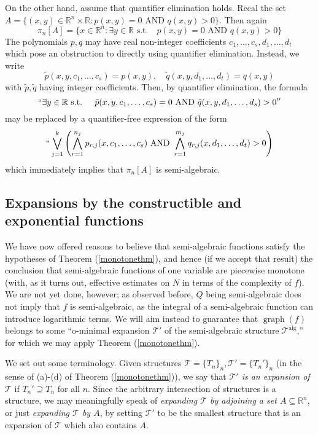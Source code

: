 \documentclass[12pt]{article}
\let\oldref\ref
\renewcommand{\ref}[1]{(\oldref{#1})}
\newcommand{\R}{\mathbb{R}}
\theoremstyle{definition}
\theoremstyle{remark}
\numberwithin{equation}{section}
\begin{document}
On the other hand, assume that quantifier elimination holds. Recal the set $A=\{(x,y)\in\R^n\times\R:p(x,y)=0\text{ AND }q(x,y)>0\}$. Then again
\begin{equation*}
    \pi_n[A]=\{x\in\R^n:\exists y\in\R\text{ s.t.}\quad p(x,y)=0\text{ AND }q(x,y)>0\}
\end{equation*}
The polynomials $p,q$ may have real non-integer coefficients $c_1,\ldots,c_s,d_1,\ldots,d_t$ which pose an obstruction to directly using quantifier elimination. Instead, we write
\begin{equation}
    \tilde{p}(x,y,c_1,\ldots,c_s)=p(x,y),\quad \tilde{q}(x,y,d_1,\ldots,d_t)=q(x,y)
\end{equation}
with $\tilde{p},\tilde{q}$ having integer coefficients. Then, by quantifier elimination, the formula
\begin{equation*}
    ``\exists y\in\R\text{ s.t. }\quad \tilde{p}(x,y,c_1,\ldots,c_s)=0\text{ AND }\tilde{q}(x,y,d_1,\ldots,d_s)>0''
\end{equation*}
may be replaced by a quantifier-free expression of the form
\begin{equation*}
    ``\bigvee_{j=1}^k\left(\bigwedge_{r=1}^{n_j}p_{r,j}(x,c_1,\ldots,c_s)\text{ AND }\bigwedge_{r=1}^{m_j}q_{r,j}(x,d_1,\ldots,d_t)>0\right)
\end{equation*}
which immediately implies that $\pi_n[A]$ is semi-algebraic.

\subsection{Expansions by the constructible and exponential functions}\label{expsubsection}

We have now offered reasons to believe that semi-algebraic functions satisfy the hypotheses of Theorem \ref{monotonethm}, and hence (if we accept that result) the conclusion that semi-algebraic functions of one variable are piecewise monotone (with, as it turns out, effective estimates on $N$ in terms of the complexity of $f$). We are not yet done, however; as observed before, $Q$ being semi-algebraic does not imply that $f$ is semi-algebraic, as the integral of a semi-algebraic function can introduce logarithmic terms. We will aim instead to guarantee that $\operatorname{graph}(f)$ belongs to some ``o-minimal expansion $\mathcal{T}'$ of the semi-algebraic structure $\mathcal{T}^{\mathrm{alg}}$,'' for which we may apply Theorem \ref{monotonethm}.

We set out some terminology. Given structures $\mathcal{T}=\{T_n\}_n,\mathcal{T}'=\{T_n'\}_n$ (in the sense of (a)-(d) of Theorem \ref{monotonethm}), we say that \textit{$\mathcal{T}'$ is an expansion of $\mathcal{T}$} if $T_n'\supseteq T_n$ for all $n$. Since the arbitrary intersection of structures is a structure, we may meaningfully speak of \textit{expanding $\mathcal{T}$ by adjoining a set $A\subseteq\R^n$}, or just \textit{expanding $\mathcal{T}$ by $A$}, by setting $\mathcal{T}'$ to be the smallest structure that is an expansion of $\mathcal{T}$ which also contains $A$.
\end{document}
